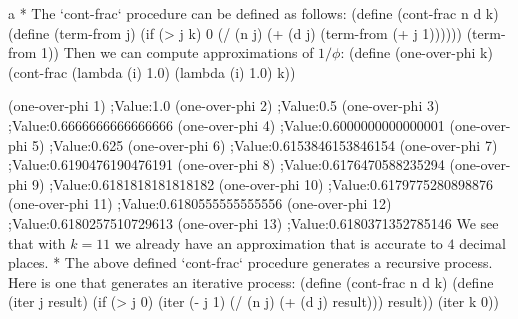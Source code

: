 \begitems\novspaces\style a
* The `cont-frac` procedure can be defined as follows:
\begtt\scm
(define (cont-frac n d k)
  (define (term-from j)
    (if (> j k)
        0
        (/ (n j)
           (+ (d j) (term-from (+ j 1))))))
  (term-from 1))
\endtt
Then we can compute approximations of $1/\phi$:
\begtt\scm
(define (one-over-phi k)
  (cont-frac (lambda (i) 1.0)
             (lambda (i) 1.0)
             k))

(one-over-phi 1)
;Value:1.0
(one-over-phi 2)
;Value:0.5
(one-over-phi 3)
;Value:0.6666666666666666
(one-over-phi 4)
;Value:0.6000000000000001
(one-over-phi 5)
;Value:0.625
(one-over-phi 6)
;Value:0.6153846153846154
(one-over-phi 7)
;Value:0.6190476190476191
(one-over-phi 8)
;Value:0.6176470588235294
(one-over-phi 9)
;Value:0.6181818181818182
(one-over-phi 10)
;Value:0.6179775280898876
(one-over-phi 11)
;Value:0.6180555555555556
(one-over-phi 12)
;Value:0.6180257510729613
(one-over-phi 13)
;Value:0.6180371352785146
\endtt
We see that with $k=11$ we already have an approximation that is accurate to $4$ decimal places.
* The above defined `cont-frac` procedure generates a recursive process.  Here is one that generates an iterative process:
\begtt\scm
(define (cont-frac n d k)
  (define (iter j result)
    (if (> j 0)
        (iter (- j 1)
              (/ (n j)
                 (+ (d j) result)))
        result))
  (iter k 0))
\endtt
\enditems
